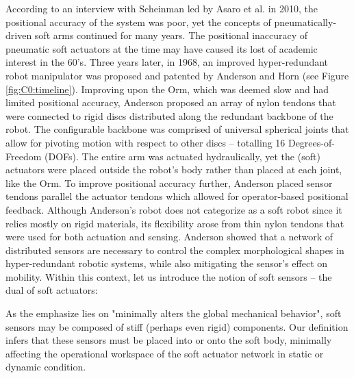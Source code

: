 According to an interview with Scheinman led by Asaro et al. \cite{ETHW2020Dec} in 2010, the positional accuracy of the system was poor, yet the concepts of pneumatically-driven soft arms continued for many years. The positional inaccuracy of pneumatic soft actuators at the time may have caused its lost of academic interest in the 60's. Three years later, in 1968, an improved hyper-redundant robot manipulator was proposed and patented by Anderson and Horn \cite{Anderson1968} (see Figure \ref{fig:C0:timeline}). Improving upon the Orm, which was deemed slow and had limited positional accuracy, Anderson proposed an array of nylon tendons that were connected to rigid discs distributed along the redundant backbone of the robot. The configurable backbone was comprised of universal spherical joints that allow for pivoting motion with respect to other discs -- totalling 16 Degrees-of-Freedom (DOFs). The entire arm was actuated hydraulically, yet the (soft) actuators were placed outside the robot's body rather than placed at each joint, like the Orm. To improve positional accuracy further, Anderson placed sensor tendons parallel the actuator tendons which allowed for operator-based positional feedback. Although Anderson's robot does not categorize as a soft robot since it relies mostly on rigid materials, its flexibility arose from thin nylon tendons that were used for both actuation and sensing. Anderson showed that a network of distributed sensors are necessary to control the complex morphological shapes in  hyper-redundant robotic systems, while also mitigating the sensor's effect on mobility. Within this context, let us introduce the notion of soft sensors -- the dual of soft actuators:

%
\begin{rmk}
\vspace{-1mm}
As the emphasize lies on "minimally alters the global mechanical behavior", soft sensors may be composed of stiff (perhaps even rigid) components. Our definition infers that these sensors must be placed into or onto the soft body, minimally affecting the operational workspace of the soft actuator network in static or dynamic condition.
\end{rmk}

